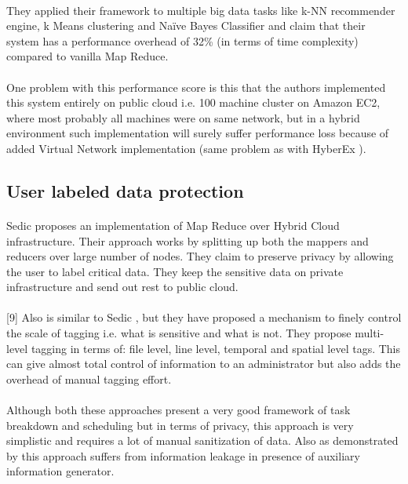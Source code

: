 \documentclass[12pt]{report}
\theoremstyle{named}
\begin{document}
\paragraph{}
They applied their framework to multiple big data tasks like k-NN recommender engine, k Means clustering and Naïve Bayes Classifier and claim that their system has a performance overhead of 32\% (in terms of time complexity) compared to vanilla Map Reduce.
\paragraph{}
One problem with this performance score is this that the authors implemented this system entirely on public cloud i.e. 100 machine cluster on Amazon EC2, where most probably all machines were on same network, but in a hybrid environment such implementation will surely suffer performance loss because of added Virtual Network implementation (same problem as with HyberEx \cite{ko2011hybrex}).
\subsection{User labeled data protection}
\paragraph{}
Sedic \cite{zhang2011sedic} proposes an implementation of Map Reduce over Hybrid Cloud infrastructure. Their approach works by splitting up both the mappers and reducers over large number of nodes. They claim to preserve privacy by allowing the user to label critical data. They keep the sensitive data on private infrastructure and send out rest to public cloud.
\paragraph{}
[9] Also is similar to Sedic \cite{zhang2011sedic}, but they have proposed a mechanism to finely control the scale of tagging i.e. what is sensitive and what is not. They propose multi-level tagging in terms of: file level, line level, temporal and spatial level tags. This can give almost total control of information to an administrator but also adds the overhead of manual tagging effort.
\paragraph{}
Although both these approaches present a very good framework of task breakdown and scheduling but in terms of privacy, this approach is very simplistic and requires a lot of manual sanitization of data. Also as demonstrated by \cite{dwork2004privacy} this approach suffers from information leakage in presence of auxiliary information generator.
\end{document}
